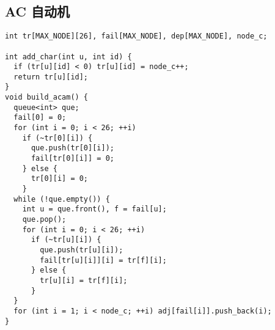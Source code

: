 \subsection{AC 自动机}
\begin{lstlisting}
int tr[MAX_NODE][26], fail[MAX_NODE], dep[MAX_NODE], node_c;

int add_char(int u, int id) {
  if (tr[u][id] < 0) tr[u][id] = node_c++;
  return tr[u][id];
}
void build_acam() {
  queue<int> que;
  fail[0] = 0;
  for (int i = 0; i < 26; ++i)
    if (~tr[0][i]) {
      que.push(tr[0][i]);
      fail[tr[0][i]] = 0;
    } else {
      tr[0][i] = 0;
    }
  while (!que.empty()) {
    int u = que.front(), f = fail[u];
    que.pop();
    for (int i = 0; i < 26; ++i)
      if (~tr[u][i]) {
        que.push(tr[u][i]);
        fail[tr[u][i]][i] = tr[f][i];
      } else {
        tr[u][i] = tr[f][i];
      }
  }
  for (int i = 1; i < node_c; ++i) adj[fail[i]].push_back(i);
}
\end{lstlisting}
